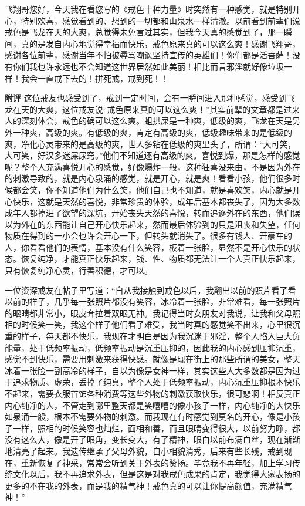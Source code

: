 \begin{case}
    飞翔哥您好，今天我在看您写的《戒色十种力量》时突然有一种感觉，就是特别开心，特别欢喜，感觉看到的、想到的一切都和山泉水一样清澈。以前看到前辈们说戒色是飞龙在天的大爽，总觉得未免言过其实，但我今天真的感觉到了，那一瞬间，真的是发自内心地觉得幸福而快乐，戒色原来真的可以这么爽！感谢飞翔哥，感谢各位前辈，感谢当年不怕被辱骂嘲讽坚持宣传的英雄们！你们都是活菩萨！没有你们我也许永远也不会知道这世界居然如此美丽！相比而言邪淫就好像垃圾一样！我会一直戒下去的！拼死戒，戒到死！！

    \textbf{附评} 这位戒友也感受到了，戒到一定时间，会有一瞬间进入那种感觉，感受到飞龙在天的大爽，这位戒友说“戒色原来真的可以这么爽！”其实前辈的文章都是过来人的深刻体会，戒色的确可以这么爽。蛆拱屎是一种爽，低级的爽，飞龙在天是另外一种爽，高级的爽。有低级的爽，肯定有高级的爽，低级趣味带来的是低级的爽，净化心灵带来的是高级的爽，世人多钻在低级的爽里头了，所谓：“大可笑，大可笑，好汉多迷屎尿窍。”他们不知道还有高级的爽。喜悦到爆，那是怎样的感觉呢？整个人充满喜悦开心的感觉，好像爆炸一般，这种狂喜没来由，不是因为外在的刺激导致的，就是内心泉涌的感觉，就是开心，就是爽！看看小孩，他们很多时候都会笑，你不知道他们为什么笑，他们自己也不知道，就是喜欢笑，内心就是开心快乐，这就是天然的喜悦，非常珍贵的体验，成年后基本都丧失了，因为大多数成年人都掉进了欲望的深坑，开始丧失天然的喜悦，转而追逐外在的东西，他们误以为外在的东西能让自己开心快乐起来，然而最后体验到的只是沮丧和失望，任何物质在得到的一小会也许会开心一下，但转头就消失了。很多有钱人、开豪车的人，你看看他们的表情，基本没有什么笑容，板着一张脸，显然不是开心快乐的状态。恢复纯净，才能真正快乐起来，钱、性、物质都无法让一个人真正快乐起来，只有恢复纯净心灵，行善积德，才可以。

    一位资深戒友在帖子里写道：“自从我接触到戒色以后，我翻出以前的照片看了看以前的样子，几乎每一张照片都没有笑容，冰冷着一张脸，非常难看，每一张照片的眼睛都非常小，眼皮耷拉着双眼无神。我记得当时女朋友对我说，让我和父母照相的时候笑一笑，我这个样子他们看了难受，我当时真的感觉笑不出来，心里很沉重的样子，每天都不快乐，我现在才明白是因为我沉迷于邪淫，整个人陷入巨大负能量，处于低频率振动，低频率振动是沉重压抑的，因此我的内心感到压抑沉重，感觉不到快乐，需要用刺激来获得快感。就像是现在街上的那些所谓的美女，整天冰着一张脸一副高冷的样子，自以为像是女神一样，其实这些人大多数都是因为过于追求物质、虚荣，丢掉了纯真，整个人处于低频率振动，内心沉重压抑根本快乐不起来，需要衣服首饰各种消费等这些外物的刺激获取快乐，很可悲啊！相反真正内心纯净的人，不管走到哪里整天都是笑嘻嘻的像小孩子一样，内心纯净的大快乐如泉涌一般，根本不需要外物的刺激。而我现在有时感觉到莫名的开心，像是小孩子一样，照相的时候笑容也灿烂，面相和善，而且眼睛变得很大，以前努力睁，都没有这么大，像是开了眼角，变长变大，有了精神，眼白以前布满血丝，现在渐渐地清亮了起来。我遗传继承了父母外貌，自小相貌清秀，后来有些长残，戒到现在，重新恢复了神采，常常会听到关于外表的赞扬。毕竟我不再年轻，加上学习传统文化以后，我不再追求外表，但是这是对我戒色成果的肯定，我觉得大家表扬的更多的不在我的外表，而是我的精气神！戒色真的可以让你提高颜值，充满精气神！”


\end{case}
